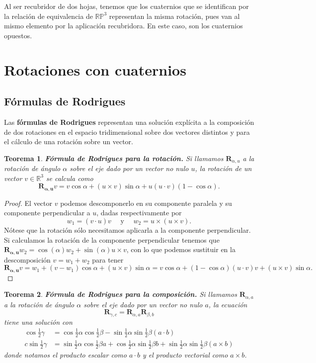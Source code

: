 \documentclass{article}
\theoremstyle{plain}
\newtheorem{theorem}{Teorema}
\theoremstyle{definition}
\theoremstyle{remark}
\begin{document}
Al ser recubridor de dos hojas, tenemos que los cuaternios que se
identifican por la relación de equivalencia de $\mathbb{RP}^3$
representan la misma rotación, pues van al mismo elemento por la
aplicación recubridora. En este caso, son los cuaternios opuestos.


\section{Rotaciones con cuaternios}
\subsection{Fórmulas de Rodrigues}
Las \textbf{fórmulas de Rodrigues} representan una solución explícita
a la composición de dos rotaciones en el espacio tridimensional sobre
dos vectores distintos y para el cálculo de una rotación sobre un
vector.

\begin{theorem}
  \textbf{Fórmula de Rodrigues para la rotación.} Si llamamos
  $\mathbf{R}_{\alpha,u}$ a la rotación de ángulo $\alpha$ sobre el
  eje dado por un vector no nulo $u$, la rotación de un vector
  $v \in\mathbb{R}^3$ se calcula como
  \[\mathbf{R_{\alpha,u}}v = v \cos \alpha + (u \times v)\sin \alpha + u(u\cdot v)(1-\cos\alpha).\]
\end{theorem}
\begin{proof}
  El vector $v$ podemos descomponerlo en su componente paralela y su
  componente perpendicular a $u$, dadas respectivamente por
  \[w_1 = (v \cdot u) v \quad \text{ y } \quad w_2 = u \times (u \times v).\]
  Nótese que la rotación sólo necesitamos aplicarla a
  la componente perpendicular. Si calculamos la rotación de la
  componente perpendicular tenemos que
  $\mathbf{R_{\alpha,u}} w_2 = \cos(\alpha) w_2 + \sin(\alpha) u \times v$, con
  lo que podemos sustituir en la descomposición $v = w_1+w_2$ para
  tener
  \[\mathbf{R_{\alpha,u}}v =
    w_1 + (v-w_1)\cos\alpha + (u \times v)\sin\alpha =
    v\cos\alpha + (1-\cos \alpha)(u \cdot v)v + (u \times v)\sin\alpha.
  \]
\end{proof}

\begin{theorem}
  \textbf{Fórmula de Rodrigues para la composición.} Si llamamos
  $\mathbf{R}_{\alpha,a}$ a la rotación de ángulo $\alpha$ sobre el
  eje dado por un vector no nulo $a$, la ecuación
  \[\mathbf{R}_{\gamma,c} =\mathbf{R}_{\alpha,a}\mathbf{R}_{\beta,b}\]
  tiene una solución con
  \[\begin{aligned}
    \cos \frac{1}{2}\gamma &=
    \cos \frac{1}{2}\alpha \cos\frac{1}{2}\beta - \sin\frac{1}{2}\alpha\sin\frac{1}{2}\beta (a\cdot b)\\
    c \sin \frac{1}{2}\gamma &=
    \sin \frac{1}{2}\alpha \cos\frac{1}{2}\beta a +
    \cos \frac{1}{2}\alpha \sin\frac{1}{2}\beta b +
    \sin \frac{1}{2}\alpha \sin\frac{1}{2}\beta (a \times b)
  \end{aligned}\]
  donde notamos el producto escalar como $a\cdot b$ y el producto vectorial como $a \times b$.
  \cite{vince11}
\end{theorem}
\end{document}
